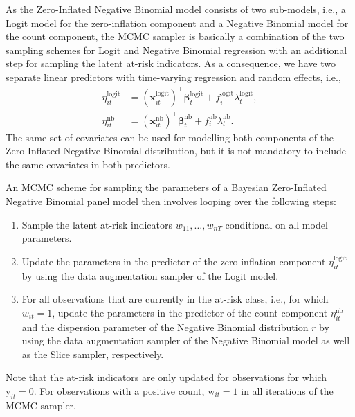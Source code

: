 \documentclass[a4paper, preprint, 3p,
authoryear]{elsarticle} %
\begin{document}
As the Zero-Inflated Negative Binomial model consists of two sub-models,
i.e., a Logit model for the zero-inflation component and a Negative
Binomial model for the count component, the MCMC sampler is basically a
combination of the two sampling schemes for Logit and Negative Binomial
regression with an additional step for sampling the latent at-risk
indicators. As a consequence, we have two separate linear predictors
with time-varying regression and random effects, i.e., \begin{equation*}
 \begin{aligned}
 \eta_{it}^{\text{logit}} &= (\textbf{x}^{\text{logit}}_{it})^\top \boldsymbol{\beta}_t^{\text{logit}} + f_i^{\text{logit}} \lambda_t^{\text{logit}}, \\
  \eta_{it}^{\text{nb}} &= (\textbf{x}^{\text{nb}}_{it})^\top \boldsymbol{\beta}_t^{\text{nb}} + f_i^{\text{nb}} \lambda_t^{\text{nb}}.
 \end{aligned}
\end{equation*} The same set of covariates can be used for modelling
both components of the Zero-Inflated Negative Binomial distribution, but
it is not mandatory to include the same covariates in both predictors.

An MCMC scheme for sampling the parameters of a Bayesian Zero-Inflated
Negative Binomial panel model then involves looping over the following
steps:

\begin{enumerate}
    \item Sample the latent at-risk indicators ${w}_{11},\dots,{w}_{nT}$ conditional on all model parameters.
    \item Update the parameters in the predictor of the zero-inflation component $\eta_{it}^{\text{logit}}$ by using the data augmentation sampler of the Logit model.
    \item For all observations that are currently in the at-risk class, i.e., for which $w_{it}=1$, update the parameters in the predictor of the count component $\eta_{it}^{\text{nb}}$ and the dispersion parameter of the Negative Binomial distribution $r$ by using the data augmentation sampler of the Negative Binomial model as well as the Slice sampler, respectively.
\end{enumerate}

Note that the at-risk indicators are only updated for observations for
which \(\text{y}_{it} = 0\). For observations with a positive count,
\(\text{w}_{it} = 1\) in all iterations of the MCMC sampler.
\end{document}
